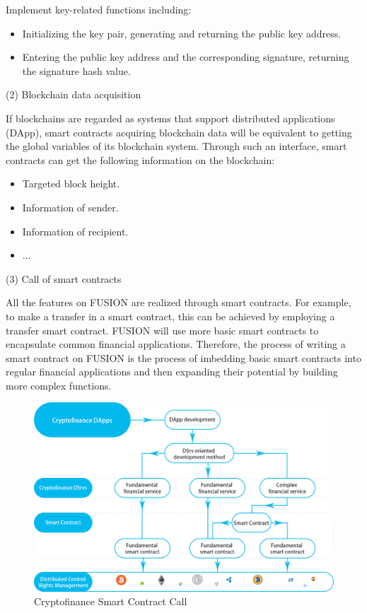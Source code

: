 \documentclass[a4paper,12pt]{article}
\begin{document}
Implement key-related functions including:

\begin{itemize} [itemindent = 1em]
\item Initializing the key pair, generating and returning the public key address.
\item Entering the public key address and the corresponding signature, returning the signature hash value.
\end{itemize}

(2) Blockchain data acquisition

If blockchains are regarded as systems that support distributed applications (DApp), smart contracts acquiring blockchain data will be equivalent to getting the global variables of its blockchain system. Through such an interface, smart contracts can get the following information on the blockchain:

\begin{itemize} [itemindent = 1em]
\item Targeted block height.
\item Information of sender.
\item Information of recipient.
\item ...
\end{itemize}

(3) Call of smart contracts

All the features on FUSION are realized through smart contracts. For example, to make a transfer in a smart contract, this can be achieved by employing a transfer smart contract. FUSION will use more basic smart contracts to encapsulate common financial applications. Therefore, the process of writing a smart contract on FUSION is the process of imbedding basic smart contracts into regular financial applications and then expanding their potential by building more complex functions.

\begin{figure} [htbp]
\centering \includegraphics [width = 5in]{pic/sccalling.png}
\caption{Cryptofinance Smart Contract Call} \label{fig: 1}
\end{figure}
\end{document}
